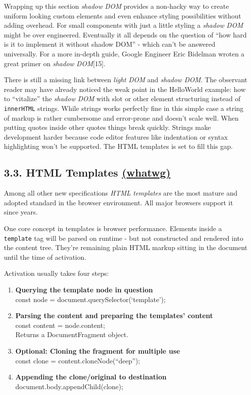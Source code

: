 \documentclass[]{article}
\providecommand{\tightlist}{%
  \setlength{\itemsep}{0pt}\setlength{\parskip}{0pt}}
\begin{document}
Wrapping up this section \emph{shadow DOM} provides a non-hacky way to
create uniform looking custom elements and even enhance styling
possibilities without adding overhead. For small components with just a
little styling a \emph{shadow DOM} might be over engineered. Eventually
it all depends on the question of ``how hard is it to implement it
without shadow DOM'' - which can't be answered universally. For a more
in-depth guide, Google Engineer Eric Bidelman wroten a great primer on
\emph{shadow DOM}{[}15{]}.

There is still a missing link between \emph{light DOM} and \emph{shadow
DOM}. The observant reader may have already noticed the weak point in
the HelloWorld example: how to ``vitalize'' the \emph{shadow DOM} with
slot or other element structuring instead of \texttt{innerHTML} strings.
While strings works perfectly fine in this simple case a string of
markup is rather cumbersome and error-prone and doesn't scale well. When
putting quotes inside other quotes things break quickly. Strings make
development harder because code editor features like indentation or
syntax highlighting won't be supported. The HTML templates is set to
fill this gap.

\subsection{\texorpdfstring{3.3. HTML Templates
\href{https://html.spec.whatwg.org/multipage/scripting.html\#the-template-element}{(whatwg)}}{3.3. HTML Templates (whatwg)}}\label{html-templates-whatwg}

Among all other new specifications \emph{HTML templates} are the most
mature and adopted standard in the browser environment. All major
browsers support it since years.

One core concept in templates is browser performance. Elements inside a
\texttt{template} tag will be parsed on runtime - but not constructed
and rendered into the content tree. They're remaining plain HTML markup
sitting in the document until the time of activation.

Activation usually takes four steps:

\begin{enumerate}
\def\labelenumi{\arabic{enumi}.}
\tightlist
\item
  \textbf{Querying the template node in question}\\
  const node = document.querySelector(`template');
\item
  \textbf{Parsing the content and preparing the templates' content}\\
  const content = node.content;\\
  Returns a DocumentFragment object.
\item
  \textbf{Optional: Cloning the fragment for multiple use}\\
  const clone = content.cloneNode(``deep'');
\item
  \textbf{Appending the clone/original to destination}\\
  document.body.appendChild(clone);
\end{enumerate}
\end{document}

